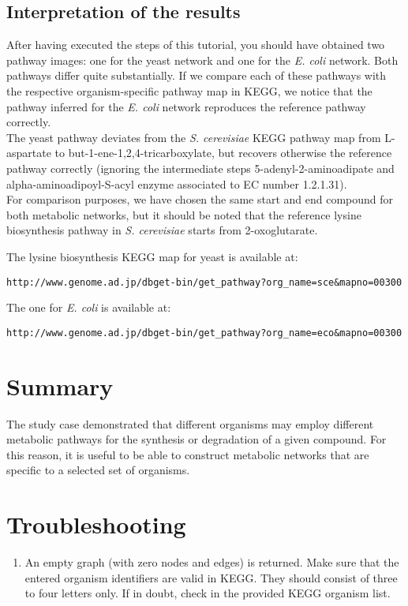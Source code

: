 \subsection{Interpretation of the results}

After having executed the steps of this tutorial, you should have
obtained two pathway images: one for the yeast network and one for the
\textit{E. coli} network. Both pathways differ quite substantially.
If we compare each of these pathways with the respective
organism-specific pathway map in KEGG, we notice that
the pathway inferred for the \textit{E. coli} network reproduces the reference pathway correctly.\\
The yeast pathway deviates from the \textit{S. cerevisiae} KEGG
pathway map from L-aspartate to but-1-ene-1,2,4-tricarboxylate, but
recovers otherwise the reference pathway correctly (ignoring the
intermediate steps 5-adenyl-2-aminoadipate and
alpha-aminoadipoyl-S-acyl enzyme associated to EC number 1.2.1.31). \\
For comparison purposes, we have chosen the same start and end
compound for both metabolic networks, but it should be noted that the
reference lysine biosynthesis pathway in \textit{S. cerevisiae} starts
from 2-oxoglutarate.

The lysine biosynthesis KEGG map for yeast is available at:

\begin{lstlisting}
http://www.genome.ad.jp/dbget-bin/get_pathway?org_name=sce&mapno=00300
\end{lstlisting}

The one for \textit{E. coli} is available at:

\begin{lstlisting}
http://www.genome.ad.jp/dbget-bin/get_pathway?org_name=eco&mapno=00300
\end{lstlisting}


\section{Summary}

The study case demonstrated that different organisms may employ
different metabolic pathways for the synthesis or degradation of a
given compound. For this reason, it is useful to be able to construct
metabolic networks that are specific to a selected set of organisms.

\section{Troubleshooting}

\begin{enumerate}

\item An empty graph (with zero nodes and edges) is returned.  Make
  sure that the entered organism identifiers are valid in KEGG.  They
  should consist of three to four letters only. If in doubt, check in
  the provided KEGG organism list.

\end{enumerate}

